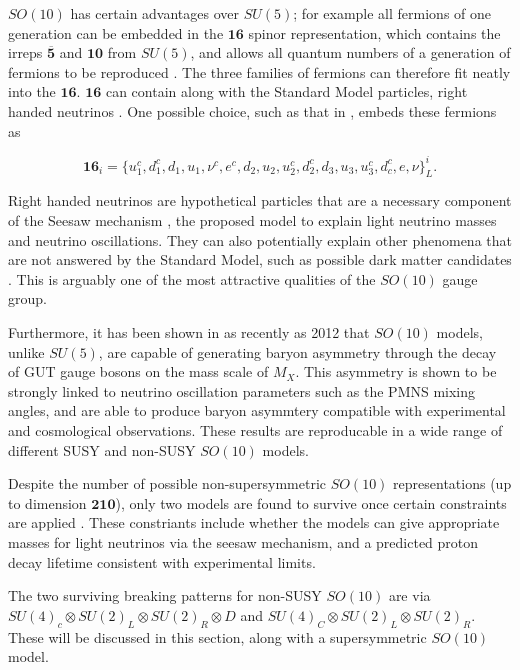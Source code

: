 \documentclass{article}
\begin{document}
$SO(10)$ has certain advantages over $SU(5)$; for example all fermions of one generation can be embedded in the $\bm{16}$ spinor representation, which contains the irreps $\overline{\bm{5}}$ and $\bm{10}$ from $SU(5)$, and allows all quantum numbers of a generation of fermions to be reproduced \cite{SO10_2}. The three families of fermions can therefore fit neatly into the $\bm{16}$. $\bm{16}$ can contain along with the Standard Model particles, right handed neutrinos \cite{SO10_1}\cite{SO10_2}. 
One possible choice, such as that in \cite{GUTPHD}, embeds these fermions as

\begin{equation}
\bm{16}_i = \{u^{c}_1,d^{c}_1,d_1,u_1,\nu^c,e^c,d_2,u_2,u^{c}_2,d^{c}_2,d_3,u_3,u^{c}_3,d^{c}_c,e,\nu\}^{i}_L.
\end{equation}

Right handed neutrinos are hypothetical particles that are a necessary component of the Seesaw mechanism \cite{SeesawMechanism}, the proposed model to explain light neutrino masses and neutrino oscillations. They can also potentially explain other phenomena that are not answered by the Standard Model, such as possible dark matter candidates \cite{RHNeutrino}. This is arguably one of the most attractive qualities of the $SO(10)$ gauge group.

Furthermore, it has been shown in \cite{SO10BaryonAsym} as recently as 2012 that $SO(10)$ models, unlike $SU(5)$, are capable of generating baryon asymmetry through the decay of GUT gauge bosons on the mass scale of $M_X$. This asymmetry is shown to be strongly linked to neutrino oscillation parameters such as the PMNS mixing angles, and are able to produce baryon asymmtery compatible with experimental and cosmological observations. These results are reproducable in a wide range of different SUSY and non-SUSY $SO(10)$ models.

Despite the number of possible non-supersymmetric $SO(10)$ representations (up to dimension $\bm{210}$), only two models are found to survive once certain constraints are applied \cite{SO10_UnificationDM}. These constriants include whether the models can give appropriate masses for light neutrinos via the seesaw mechanism, and a predicted proton decay lifetime consistent with experimental limits.

The two surviving breaking patterns for non-SUSY $SO(10)$ are via $SU(4)_c \otimes SU(2)_L \otimes SU(2)_R\otimes D$ and $SU(4)_C \otimes SU(2)_L \otimes SU(2)_R$. These will be discussed in this section, along with a supersymmetric $SO(10)$ model.
\end{document}
